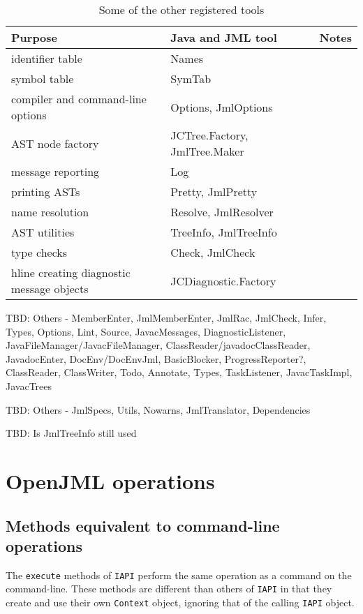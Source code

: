 \documentclass{report}%
\begin{document}
\begin{table}[bth]
\begin{center}
\begin{tabular}{|l|l|l|}

\hline
Purpose & Java and JML tool &  Notes \\
\hline
identifier table & Names & \\
\hline
symbol table & SymTab & \\
\hline
compiler and command-line options & Options, JmlOptions & \\
\hline
AST node factory & JCTree.Factory, JmlTree.Maker & \\
\hline
message reporting & Log & \\
\hline
printing ASTs & Pretty, JmlPretty & \\
\hline
name resolution & Resolve, JmlResolver & \\
\hline
AST utilities & TreeInfo, JmlTreeInfo & \\
\hline
type checks & Check, JmlCheck & \\
hline
creating diagnostic message objects & JCDiagnostic.Factory & \\
\hline
\end{tabular}
\end{center}
\caption{Some of the other registered tools}
\label{Tools2}
\end{table}

TBD: Others - MemberEnter, JmlMemberEnter, JmlRac, JmlCheck, Infer, Types, Options, Lint, Source, JavacMessages, DiagnosticListener, JavaFileManager/JavacFileManager, ClassReader/javadocClassReader, JavadocEnter, DocEnv/DocEnvJml, BasicBlocker, ProgressReporter?, ClassReader, ClassWriter, Todo, Annotate, Types, TaskListener, JavacTaskImpl, JavacTrees

TBD: Others - JmlSpecs, Utils, Nowarns, JmlTranslator, Dependencies

TBD: Is JmlTreeInfo still used

\section{OpenJML operations}

\subsection{Methods equivalent to command-line operations}

The {\tt execute} methods of {\tt IAPI} perform the same operation as a command on the command-line.
These methods are different than others of {\tt IAPI} in that they create and use their own {\tt Context}
object, ignoring that of the calling {\tt IAPI} object.
\end{document}
